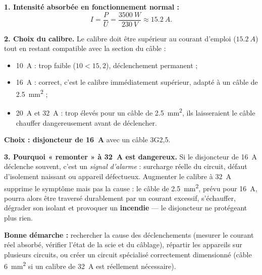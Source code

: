 \documentclass[11pt]{article}
\begin{document}
\begin{corrige}
\textbf{1. Intensité absorbée en fonctionnement normal :}
\[
I = \frac{P}{U} = \frac{\SI{3500}{W}}{\SI{230}{V}} \approx \SI{15,2}{A}.
\]

\textbf{2. Choix du calibre.} Le calibre doit être supérieur au courant d'emploi ($\SI{15,2}{A}$) tout en restant compatible avec la section du câble :
\begin{itemize}
\item \SI{10}{A} : trop faible ($10 < 15,2$), déclenchement permanent ;
\item \SI{16}{A} : correct, c'est le calibre immédiatement supérieur, adapté à un câble de \SI{2,5}{mm^2} ;
\item \SI{20}{A} et \SI{32}{A} : trop élevés pour un câble de \SI{2,5}{mm^2}, ils laisseraient le câble chauffer dangereusement avant de déclencher.
\end{itemize}
\textbf{Choix : disjoncteur de \SI{16}{A}} avec un câble 3G2,5.

\textbf{3. Pourquoi « remonter » à \SI{32}{A} est dangereux.} Si le disjoncteur de \SI{16}{A} déclenche souvent, c'est un \emph{signal d'alarme} : surcharge réelle du circuit, défaut d'isolement naissant ou appareil défectueux. Augmenter le calibre à \SI{32}{A} supprime le symptôme mais pas la cause : le câble de \SI{2,5}{mm^2}, prévu pour \SI{16}{A}, pourra alors être traversé durablement par un courant excessif, s'échauffer, dégrader son isolant et provoquer un \textbf{incendie} — le disjoncteur ne protégeant plus rien.

\textbf{Bonne démarche :} rechercher la cause des déclenchements (mesurer le courant réel absorbé, vérifier l'état de la scie et du câblage), répartir les appareils sur plusieurs circuits, ou créer un circuit spécialisé correctement dimensionné (câble \SI{6}{mm^2} si un calibre de \SI{32}{A} est réellement nécessaire).
\end{corrige}
\end{document}
